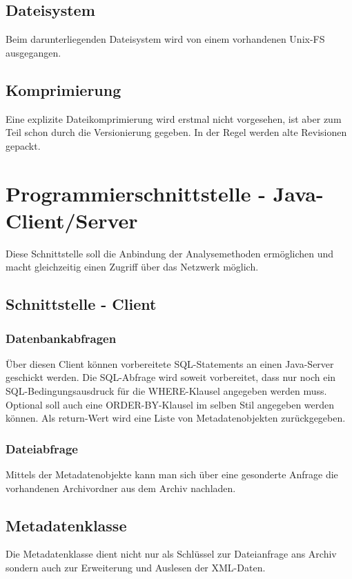 \subsection{Dateisystem} \label{spec:req:archive:fs}
	Beim darunterliegenden Dateisystem wird von einem vorhandenen Unix-FS ausgegangen.
\subsection{Komprimierung} \label{spec:req:archive:comp}
	Eine explizite Dateikomprimierung wird erstmal nicht vorgesehen, ist aber zum Teil schon durch die Versionierung gegeben.
	In der Regel werden alte Revisionen gepackt.

\section{Programmierschnittstelle - Java-Client/Server}\label{spec:req:jcs}
	Diese Schnittstelle soll die Anbindung der Analysemethoden ermöglichen und macht gleichzeitig einen Zugriff über das Netzwerk möglich.
\subsection{Schnittstelle - Client}\label{spec:req:jcs:client}
	\subsubsection{Datenbankabfragen} \label{spec:req:jcs:client:dbquery}
		Über diesen Client können vorbereitete SQL-Statements an einen Java-Server geschickt werden. 
		Die SQL-Abfrage wird soweit vorbereitet, dass nur noch ein SQL-Bedingungsausdruck für die WHERE-Klausel angegeben werden muss.
		Optional soll auch eine ORDER-BY-Klausel im selben Stil angegeben werden können. 
		Als return-Wert wird eine Liste von Metadatenobjekten zurückgegeben.
	\subsubsection{Dateiabfrage} \label{spec:req:jcs:client:fsquery}
		Mittels der Metadatenobjekte kann man sich über eine gesonderte Anfrage die vorhandenen Archivordner aus dem Archiv nachladen.
\subsection{Metadatenklasse} \label{spec:req:jcs:meta}
	Die Metadatenklasse dient nicht nur als Schlüssel zur Dateianfrage ans Archiv sondern auch zur Erweiterung und Auslesen der XML-Daten.

